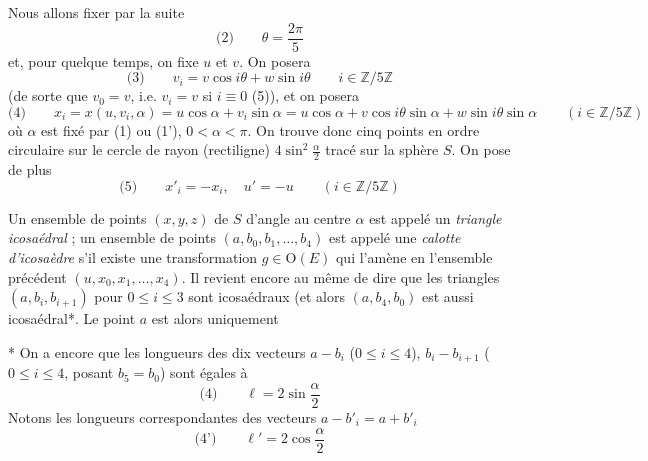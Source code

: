 \documentclass[11pt,a4paper]{article}
\begin{document}
Nous allons fixer par la suite
\[
  \text{(2)} \qquad \theta = \frac{2\pi}{5}
\]
et, pour quelque temps, on fixe $u$ et $v$. On posera
\[
  \text{(3)} \qquad v_i = v \cos i\theta + w \sin i\theta \qquad i \in \mathbb{Z}/5\mathbb{Z}
\]
(de sorte que $v_0 = v$, i.e. $v_i = v$ si $i \equiv 0$ (5)), et on posera
\struck{\ill{}}
\[
  \text{(4)} \qquad x_i = x(u, v_i, \alpha) = u\cos\alpha + v_i \sin\alpha = u\cos\alpha + v\cos i\theta \sin\alpha + w \sin i\theta \sin\alpha \qquad (i \in \mathbb{Z}/5\mathbb{Z})
\]
où $\alpha$ est fixé par (1) ou (1'), $0 < \alpha < \pi$. On trouve donc cinq points en ordre circulaire sur le cercle de  rayon (rectiligne) $4\sin^2\frac{\alpha}{2}$ tracé sur la sphère $S$. On pose de plus
\[
  \text{(5)} \qquad x'_i = -x_i , \quad u' = -u \qquad (i \in \mathbb{Z}/5\mathbb{Z})
\]

Un ensemble de points $(x,y,z)$ de $S$  d'angle au centre $\alpha$ est appelé un \emph{triangle icosaédral} ;  un ensemble de points $(a, b_0, b_1, \ldots, b_4)$  est appelé une \emph{calotte d'icosaèdre} s'il existe une transformation  $g \in \mathrm{O}(E)$ qui l'amène en l'ensemble précédent $(u, x_0, x_1, \ldots, x_4)$. Il revient encore au même  de dire  que les triangles $(a, b_i, b_{i+1})$ pour $0 \leqslant i \leqslant 3$ sont icosaédraux (et alors $(a, b_4, b_0)$ est aussi icosaédral*. Le point $a$ est alors uniquement

* On a encore que les longueurs des dix vecteurs $a - b_i$ ($0 \leqslant i \leqslant 4$), $b_i - b_{i+1}$ ($0 \leqslant i \leqslant 4$, posant $b_5 = b_0$) sont égales à
\[
  \text{(4)} \qquad \ell = 2 \sin\frac{\alpha}{2}
\]
Notons les longueurs correspondantes des vecteurs $a - b'_i = a + b'_i$
\[
  \text{(4')} \qquad \ell' = 2 \cos\frac{\alpha}{2}
\]
\end{document}
